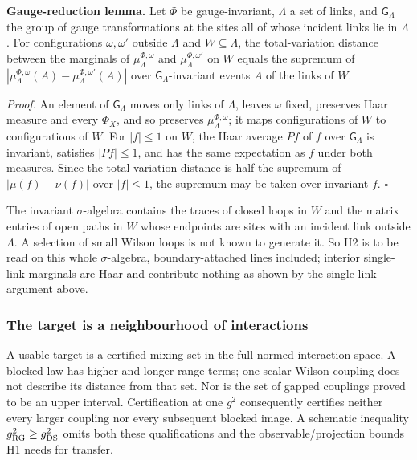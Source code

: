 \documentclass[11pt,a4paper]{article}
\begin{document}
\textbf{Gauge-reduction lemma.} Let \(\Phi\) be gauge-invariant,
\(\Lambda\) a set of links, and \(\mathsf G_\Lambda\) the group of gauge
transformations at the sites all of whose incident links lie in
\(\Lambda\). For configurations \(\omega,\omega'\) outside \(\Lambda\)
and \(W\subseteq\Lambda\), the total-variation distance between the
marginals of \(\mu_\Lambda^{\Phi,\omega}\) and
\(\mu_\Lambda^{\Phi,\omega'}\) on \(W\) equals the supremum of
\(|\mu_\Lambda^{\Phi,\omega}(A)-\mu_\Lambda^{\Phi,\omega'}(A)|\) over
\(\mathsf G_\Lambda\)-invariant events \(A\) of the links of \(W\).

\emph{Proof.} An element of \(\mathsf G_\Lambda\) moves only links of
\(\Lambda\), leaves \(\omega\) fixed, preserves Haar measure and every
\(\Phi_X\), and so preserves \(\mu_\Lambda^{\Phi,\omega}\); it maps
configurations of \(W\) to configurations of \(W\). For \(|f|\le1\) on
\(W\), the Haar average \(Pf\) of \(f\) over \(\mathsf G_\Lambda\) is
invariant, satisfies \(|Pf|\le1\), and has the same expectation as \(f\)
under both measures. Since the total-variation distance is half the
supremum of \(|\mu(f)-\nu(f)|\) over \(|f|\le1\), the supremum may be
taken over invariant \(f\). \(\square\)

The invariant \(\sigma\)-algebra contains the traces of closed loops in
\(W\) and the matrix entries of open paths in \(W\) whose endpoints are
sites with an incident link outside \(\Lambda\). A selection of small
Wilson loops is not known to generate it. So H2 is to be read on this
whole \(\sigma\)-algebra, boundary-attached lines included; interior
single-link marginals are Haar and contribute nothing as shown by the
single-link argument above.

\hypertarget{the-target-is-a-neighbourhood-of-interactions}{%
\subsubsection{The target is a neighbourhood of
interactions}\label{the-target-is-a-neighbourhood-of-interactions}}

A usable target is a certified mixing set in the full normed interaction
space. A blocked law has higher and longer-range terms; one scalar
Wilson coupling does not describe its distance from that set. Nor is the
set of gapped couplings proved to be an upper interval. Certification at
one \(g^2\) consequently certifies neither every larger coupling nor
every subsequent blocked image. A schematic inequality
\(g_{\rm RG}^2\ge g_{\rm DS}^2\) omits both these qualifications and the
observable/projection bounds H1 needs for transfer.
\end{document}
